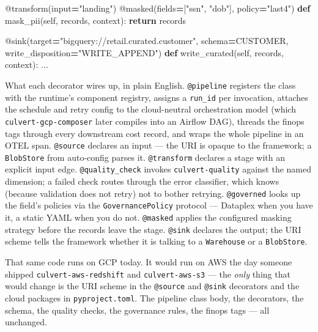 \documentclass[
  11pt,
  british,
  oneside]{book}
\newenvironment{Shaded}{\begin{snugshade}}{\end{snugshade}}
\newcommand{\AttributeTok}[1]{\textcolor[rgb]{0.77,0.63,0.00}{#1}}
\newcommand{\BuiltInTok}[1]{#1}
\newcommand{\ControlFlowTok}[1]{\textcolor[rgb]{0.13,0.29,0.53}{\textbf{#1}}}
\newcommand{\KeywordTok}[1]{\textcolor[rgb]{0.13,0.29,0.53}{\textbf{#1}}}
\newcommand{\NormalTok}[1]{#1}
\newcommand{\OperatorTok}[1]{\textcolor[rgb]{0.81,0.36,0.00}{\textbf{#1}}}
\newcommand{\StringTok}[1]{\textcolor[rgb]{0.31,0.60,0.02}{#1}}
\newcommand{\VariableTok}[1]{\textcolor[rgb]{0.00,0.00,0.00}{#1}}
\begin{document}
\begin{Shaded}
\begin{Highlighting}[]
    \AttributeTok{@transform}\NormalTok{(}\BuiltInTok{input}\OperatorTok{=}\StringTok{"landing"}\NormalTok{)}
    \AttributeTok{@masked}\NormalTok{(fields}\OperatorTok{=}\NormalTok{[}\StringTok{"ssn"}\NormalTok{, }\StringTok{"dob"}\NormalTok{], policy}\OperatorTok{=}\StringTok{"last4"}\NormalTok{)}
    \KeywordTok{def}\NormalTok{ mask\_pii(}\VariableTok{self}\NormalTok{, records, context):}
        \ControlFlowTok{return}\NormalTok{ records}

    \AttributeTok{@sink}\NormalTok{(target}\OperatorTok{=}\StringTok{"bigquery://retail.curated.customer"}\NormalTok{, schema}\OperatorTok{=}\NormalTok{CUSTOMER,}
\NormalTok{          write\_disposition}\OperatorTok{=}\StringTok{"WRITE\_APPEND"}\NormalTok{)}
    \KeywordTok{def}\NormalTok{ write\_curated(}\VariableTok{self}\NormalTok{, records, context): ...}
\end{Highlighting}
\end{Shaded}

What each decorator wires up, in plain English. \texttt{@pipeline}
registers the class with the runtime's component registry, assigns a
\texttt{run\_id} per invocation, attaches the schedule and retry config
to the cloud-neutral orchestration model (which
\texttt{culvert-gcp-composer} later compiles into an Airflow DAG),
threads the finops tags through every downstream cost record, and wraps
the whole pipeline in an OTEL span. \texttt{@source} declares an input
--- the URI is opaque to the framework; a \texttt{BlobStore} from
auto-config parses it. \texttt{@transform} declares a stage with an
explicit input edge. \texttt{@quality\_check} invokes
\texttt{culvert-quality} against the named dimension; a failed check
routes through the error classifier, which knows (because validation
does not retry) not to bother retrying. \texttt{@governed} looks up the
field's policies via the \texttt{GovernancePolicy} protocol --- Dataplex
when you have it, a static YAML when you do not. \texttt{@masked}
applies the configured masking strategy before the records leave the
stage. \texttt{@sink} declares the output; the URI scheme tells the
framework whether it is talking to a \texttt{Warehouse} or a
\texttt{BlobStore}.

That same code runs on GCP today. It would run on AWS the day someone
shipped \texttt{culvert-aws-redshift} and \texttt{culvert-aws-s3} ---
the \emph{only} thing that would change is the URI scheme in the
\texttt{@source} and \texttt{@sink} decorators and the cloud packages in
\texttt{pyproject.toml}. The pipeline class body, the decorators, the
schema, the quality checks, the governance rules, the finops tags ---
all unchanged.
\end{document}

